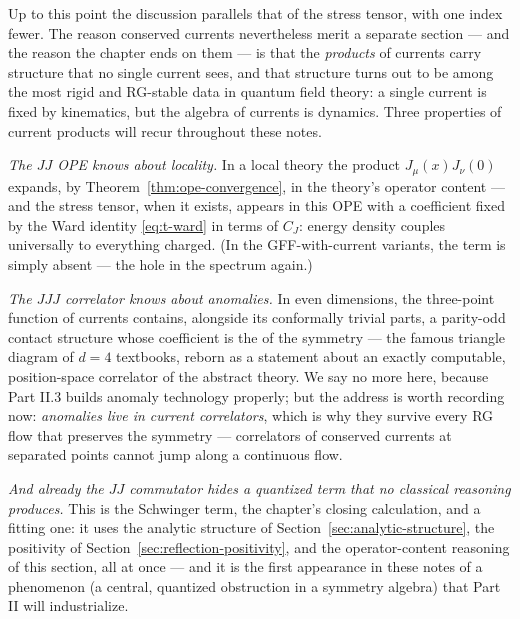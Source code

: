 Up to this point the discussion parallels that of the stress tensor, with
one index fewer. The reason conserved currents nevertheless merit a separate
section --- and the reason the chapter ends on them --- is that the
\emph{products} of currents carry structure that no single current sees, and
that structure turns out to be among the most rigid and RG-stable data in
quantum field theory: a single current is fixed by kinematics, but the
algebra of currents is dynamics. Three properties of current products will
recur throughout these notes.

\emph{The $JJ$ OPE knows about locality.} In a local theory the product
$J_\mu(x) J_\nu(0)$ expands, by Theorem~\ref{thm:ope-convergence}, in the
theory's operator content --- and the stress tensor, when it exists, appears
in this OPE with a coefficient fixed by the Ward identity
\eqref{eq:t-ward} in terms of $C_J$: energy density couples universally to
everything charged. (In the GFF-with-current variants, the term is simply
absent --- the hole in the spectrum again.)

\emph{The $JJJ$ correlator knows about anomalies.} In even dimensions, the
three-point function of currents contains, alongside its conformally trivial
parts, a parity-odd contact structure whose coefficient is the  of the symmetry --- the famous triangle diagram of $d=4$
textbooks, reborn as a statement about an exactly computable, position-space
correlator of the abstract theory. We say no more here, because Part II.3
builds anomaly technology properly; but the address is worth recording now:
\emph{anomalies live in current correlators}, which is why they survive every
RG flow that preserves the symmetry --- correlators of conserved currents at
separated points cannot jump along a continuous flow.

\emph{And already the $JJ$ commutator hides a quantized term that no
classical reasoning produces.} This is the Schwinger term, the chapter's
closing calculation, and a fitting one: it uses the analytic structure of
Section~\ref{sec:analytic-structure}, the positivity of
Section~\ref{sec:reflection-positivity}, and the operator-content reasoning
of this section, all at once --- and it is the first appearance in these
notes of a phenomenon (a central, quantized obstruction in a symmetry
algebra) that Part II will industrialize.

